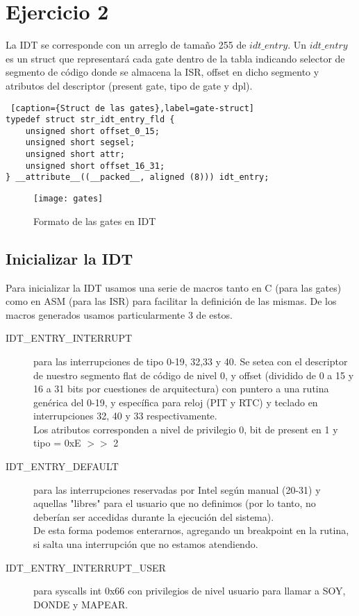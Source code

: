 \section{Ejercicio 2}

La IDT se corresponde con un arreglo de tamaño 255 de $idt\_entry$. Un $idt\_entry$ es un struct que representará cada gate dentro de la tabla indicando selector de segmento de código donde se almacena la ISR, offset en dicho segmento y atributos del descriptor (present gate, tipo de gate y dpl). 

\begin{lstlisting} [caption={Struct de las gates},label=gate-struct]
typedef struct str_idt_entry_fld {
    unsigned short offset_0_15;
    unsigned short segsel;
    unsigned short attr;
    unsigned short offset_16_31;
} __attribute__((__packed__, aligned (8))) idt_entry;
\end{lstlisting}

\begin{figure}[H]
    \centering
    \texttt{[image: gates]}
    \caption{Formato de las gates en IDT}
    \label{fig:gates}
\end{figure}



\subsection{Inicializar la IDT}

Para inicializar la IDT usamos una serie de macros tanto en C (para las gates) como en ASM (para las ISR) para facilitar la definición de las mismas.
De los macros generados usamos particularmente 3 de estos.
\begin{description}
\item [IDT_ENTRY_INTERRUPT] para las interrupciones de tipo 0-19, 32,33 y 40. Se setea con el descriptor de nuestro segmento flat de código de nivel 0, y offset (dividido de 0 a 15 y 16 a 31 bits por cuestiones de arquitectura) con puntero a una rutina genérica del 0-19, y específica para reloj (PIT y RTC) y teclado en interrupciones 32, 40 y 33 respectivamente. \\
Los atributos corresponden a nivel de privilegio 0, bit de present en 1 y tipo = 0xE $>>$ 2
\item [IDT_ENTRY_DEFAULT] para las interrupciones reservadas por Intel según manual (20-31) y aquellas "libres" para el usuario que no definimos (por lo tanto, no deberían ser accedidas durante la ejecución del sistema). \\
De esta forma podemos enterarnos, agregando un breakpoint en la rutina, si salta una interrupción que no estamos atendiendo.
\item [IDT_ENTRY_INTERRUPT_USER] para syscalls int 0x66 con privilegios de nivel usuario para llamar a SOY, DONDE y MAPEAR.
\end{description} 


